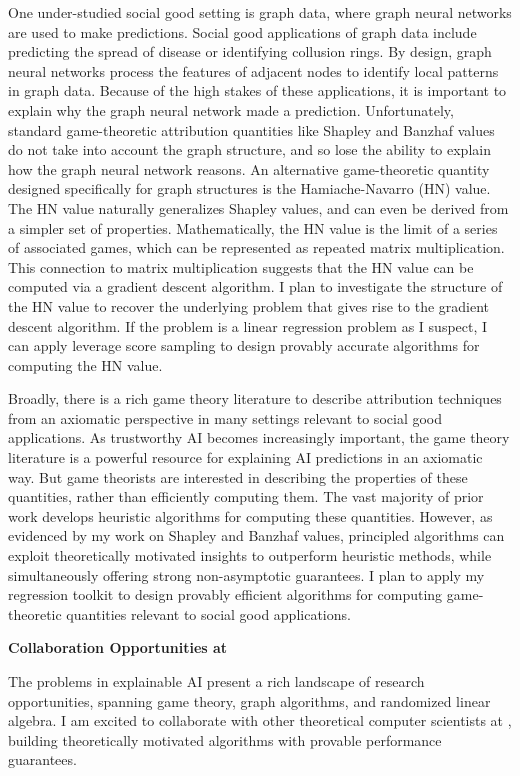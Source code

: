 \documentclass[11pt]{article}
\begin{document}
{One under-studied social good setting is graph data, where graph neural networks are used to make predictions.
Social good applications of graph data include predicting the spread of disease or identifying collusion rings.
By design, graph neural networks process the features of adjacent nodes to identify local patterns in graph data.
Because of the high stakes of these applications, it is important to explain why the graph neural network made a prediction.
Unfortunately, standard game-theoretic attribution quantities like Shapley and Banzhaf values do not take into account the graph structure, and so lose the ability to explain how the graph neural network reasons.
An alternative game-theoretic quantity designed specifically for graph structures is the Hamiache-Navarro (HN) value.
The HN value naturally generalizes Shapley values, and can even be derived from a simpler set of properties.
Mathematically, the HN value is the limit of a series of associated games, which can be represented as repeated matrix multiplication.
This connection to matrix multiplication suggests that the HN value can be computed via a gradient descent algorithm.
I plan to investigate the structure of the HN value to recover the underlying problem that gives rise to the gradient descent algorithm.
If the problem is a linear regression problem as I suspect, I can apply leverage score sampling to design provably accurate algorithms for computing the HN value.

Broadly, there is a rich game theory literature to describe attribution techniques from an axiomatic perspective in many settings relevant to social good applications.
As trustworthy AI becomes increasingly important, the game theory literature is a powerful resource for explaining AI predictions in an axiomatic way.
But game theorists are interested in describing the properties of these quantities, rather than efficiently computing them.
The vast majority of prior work develops heuristic algorithms for computing these quantities.
However, as evidenced by my work on Shapley and Banzhaf values, principled algorithms can exploit theoretically motivated insights to outperform heuristic methods, while simultaneously offering strong non-asymptotic guarantees.
I plan to apply my regression toolkit to design provably efficient algorithms for computing game-theoretic quantities relevant to social good applications. 

{ \large \textbf{Collaboration Opportunities at \school}}

The problems in explainable AI present a rich landscape of research opportunities, spanning game theory, graph algorithms, and randomized linear algebra.
I am excited to collaborate with other theoretical computer scientists at \school, building theoretically motivated algorithms with provable performance guarantees.

}
\end{document}
